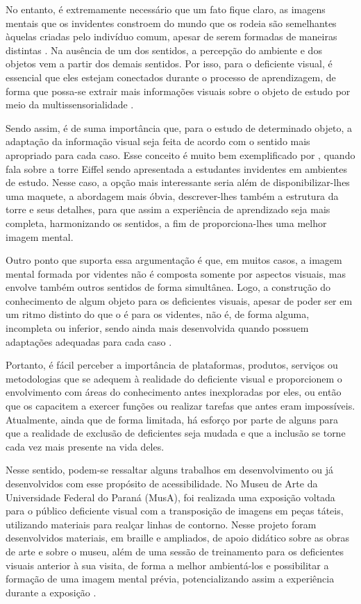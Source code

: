 No entanto, é extremamente necessário que um fato fique claro, as imagens mentais que os invidentes constroem do mundo que os rodeia são semelhantes àquelas criadas pelo indivíduo comum, apesar de serem formadas de maneiras distintas . Na ausência de um dos sentidos, a percepção do ambiente e dos objetos vem a partir dos demais sentidos. Por isso, para o deficiente visual, é essencial que eles estejam conectados durante o processo de aprendizagem, de forma que possa-se extrair mais informações visuais sobre o objeto de estudo por meio da multissensorialidade .

Sendo assim, é de suma importância que, para o estudo de determinado objeto, a adaptação da informação visual seja feita de acordo com o sentido mais apropriado para cada caso. Esse conceito é muito bem exemplificado por , quando fala sobre a torre Eiffel sendo apresentada a estudantes invidentes em ambientes de estudo. Nesse caso, a opção mais interessante seria além de disponibilizar-lhes uma maquete, a abordagem mais óbvia, descrever-lhes também a estrutura da torre e seus detalhes, para que assim a experiência de aprendizado seja mais completa, harmonizando os sentidos, a fim de proporciona-lhes uma melhor imagem mental.

Outro ponto que suporta essa argumentação é que, em muitos casos, a imagem mental formada por videntes não é composta somente por aspectos visuais, mas envolve também outros sentidos de forma simultânea. Logo, a construção do conhecimento de algum objeto para os deficientes visuais, apesar de poder ser em um ritmo distinto do que o é para os videntes, não é, de forma alguma, incompleta ou inferior, sendo ainda mais desenvolvida quando possuem adaptações adequadas para cada caso .

Portanto, é fácil perceber a importância de plataformas, produtos, serviços ou metodologias que se adequem à realidade do deficiente visual e proporcionem o envolvimento com áreas do conhecimento antes inexploradas por eles, ou então que os capacitem a exercer funções ou realizar tarefas que antes eram impossíveis. Atualmente, ainda que de forma limitada, há esforço por parte de alguns para que a realidade de exclusão de deficientes seja mudada e que a inclusão se torne cada vez mais presente na vida deles.

Nesse sentido, podem-se ressaltar alguns trabalhos em desenvolvimento ou já desenvolvidos com esse propósito de acessibilidade. No Museu de Arte da Universidade Federal do Paraná (MusA), foi realizada uma exposição voltada para o público deficiente visual com a transposição de imagens em peças táteis, utilizando materiais para realçar linhas de contorno. Nesse projeto foram desenvolvidos materiais, em braille e ampliados, de apoio didático sobre as obras de arte e sobre o museu, além de uma sessão de treinamento para os deficientes visuais anterior à sua visita, de forma a melhor ambientá-los e possibilitar a formação de uma imagem mental prévia, potencializando assim a experiência durante a exposição .

